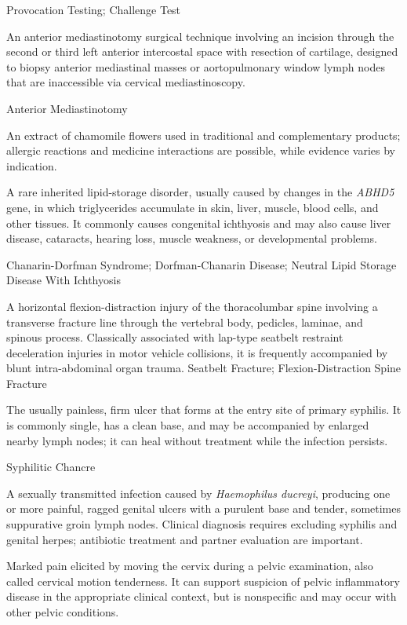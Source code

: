 \synonyms
Provocation Testing; Challenge Test

 An anterior mediastinotomy surgical technique involving an incision through the second or third left anterior intercostal space with resection of cartilage, designed to biopsy anterior mediastinal masses or aortopulmonary window lymph nodes that are inaccessible via cervical mediastinoscopy.

\synonyms
Anterior Mediastinotomy

 An extract of chamomile flowers used in traditional and complementary products; allergic reactions and medicine interactions are possible, while evidence varies by indication.

 A rare inherited lipid-storage disorder, usually caused by changes in the \textit{ABHD5} gene, in which triglycerides accumulate in skin, liver, muscle, blood cells, and other tissues. It commonly causes congenital ichthyosis and may also cause liver disease, cataracts, hearing loss, muscle weakness, or developmental problems.

\synonyms
Chanarin-Dorfman Syndrome; Dorfman-Chanarin Disease; Neutral Lipid Storage Disease With Ichthyosis


 A horizontal flexion-distraction injury of the thoracolumbar spine involving a transverse fracture line through the vertebral body, pedicles, laminae, and spinous process. Classically associated with lap-type seatbelt restraint deceleration injuries in motor vehicle collisions, it is frequently accompanied by blunt intra-abdominal organ trauma.
\synonyms
Seatbelt Fracture; Flexion-Distraction Spine Fracture

 The usually painless, firm ulcer that forms at the entry site of primary syphilis. It is commonly single, has a clean base, and may be accompanied by enlarged nearby lymph nodes; it can heal without treatment while the infection persists.

\synonyms
Syphilitic Chancre

 A sexually transmitted infection caused by \textit{Haemophilus ducreyi}, producing one or more painful, ragged genital ulcers with a purulent base and tender, sometimes suppurative groin lymph nodes. Clinical diagnosis requires excluding syphilis and genital herpes; antibiotic treatment and partner evaluation are important.

 Marked pain elicited by moving the cervix during a
pelvic examination, also called cervical motion tenderness. It can support
suspicion of pelvic inflammatory disease in the appropriate clinical context,
but is nonspecific and may occur with other pelvic conditions.

